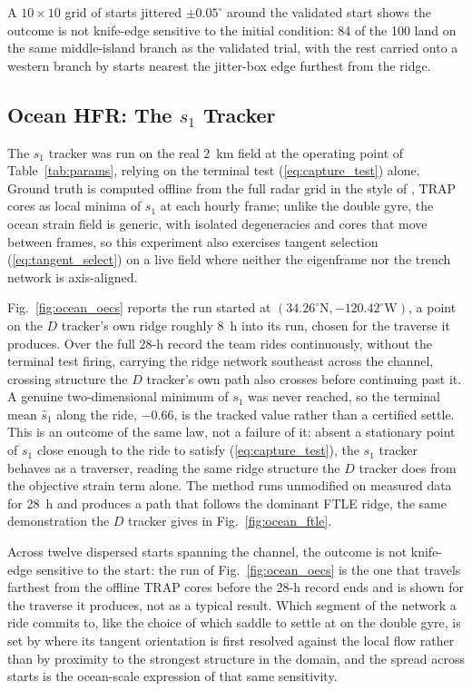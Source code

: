 \documentclass[lettersize,journal]{IEEEtran}
\begin{document}
A $10 \times 10$ grid of starts jittered $\pm 0.05^{\circ}$ around the
validated start shows the outcome is not knife-edge sensitive to the
initial condition: 84 of the 100 land on the same middle-island branch
as the validated trial, with the rest carried onto a western branch by
starts nearest the jitter-box edge furthest from the ridge.

\subsection{Ocean HFR: The $s_1$ Tracker}
\label{sec:results_ocean_oecs}
The $s_1$ tracker was run on the real 2~km field at the operating point
of Table~\ref{tab:params}, relying on the terminal test
(\ref{eq:capture_test}) alone. Ground truth is
computed offline from the full radar grid in the style of \cite{17,36},
TRAP cores as local minima of $s_1$ at each hourly frame; unlike the
double gyre, the ocean strain field is generic, with isolated
degeneracies and cores that move between frames, so this experiment also
exercises tangent selection (\ref{eq:tangent_select}) on a live field
where neither the eigenframe nor the trench network is axis-aligned.

Fig.~\ref{fig:ocean_oecs} reports the run started at
$(34.26^{\circ}\mathrm{N}, -120.42^{\circ}\mathrm{W})$, a point on the
$D$ tracker's own ridge roughly 8~h into its run, chosen for the
traverse it produces. Over the full 28-h record the team rides
continuously, without the terminal test firing, carrying the ridge
network southeast across the channel, crossing structure the $D$
tracker's own path also crosses before continuing past it. A genuine
two-dimensional minimum of $s_1$ was never
reached, so the terminal mean $\hat{s}_1$ along the ride, $-0.66$, is
the tracked value rather than a certified settle. This is an outcome of
the same law, not a failure of it: absent a stationary point of $s_1$
close enough to the ride to satisfy (\ref{eq:capture_test}), the $s_1$
tracker behaves as a traverser, reading the same ridge structure the $D$
tracker does from the objective strain term alone. The method runs
unmodified on measured data for 28~h and produces a path that follows
the dominant FTLE ridge, the same demonstration the $D$ tracker gives
in Fig.~\ref{fig:ocean_ftle}.

Across twelve dispersed starts spanning the channel, the outcome is not
knife-edge sensitive to the start: the run of Fig.~\ref{fig:ocean_oecs}
is the one that travels farthest from the offline TRAP cores before the
28-h record ends and is shown for the traverse it produces, not as a
typical result. Which segment of the network a ride commits to, like the
choice of which saddle to settle at on the double gyre, is set by where
its tangent orientation is first resolved against the local flow rather
than by proximity to the strongest structure in the domain, and the
spread across starts is the ocean-scale expression of that same
sensitivity.
\end{document}
